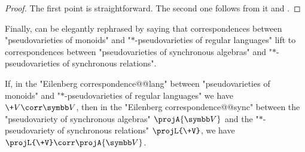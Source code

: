 \begin{proof}
	The first point is straightforward. The second one follows from it and .
\end{proof}

\AP{}
Finally,  can be elegantly rephrased
by saying that correspondences between "pseudovarieties of monoids"
and "$\ast$-pseudovarieties of regular languages" lift to correspondences
between "pseudovarieties of synchronous algebras" and
"$\ast$-pseudovarieties of synchronous relations".

\begin{theorem}
	\AP\label{thm:lifting-theorem-monoids-pseudovarieties}
	If, in the "Eilenberg correspondence@@lang"
	between "pseudovarieties of mon\-oids" and "$\ast$-pseudovarieties of regular languages"
	we have~$\+V \corr \B{V}$,
	then in the "Eilenberg correspondence@@sync"
	between the "pseudovariety of synchronous algebras" $\projA{\B{V}}$ and
	the "$\ast$-pseudovariety of synchronous relations" $\projL{\+V}$,
	we have~$\projL{\+V} \corr \projA{\B{V}}$.
\end{theorem}